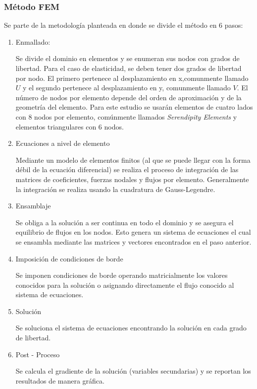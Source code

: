 		\subsubsection{Método FEM}
		Se parte de la metodología planteada en \textcite{Reddy} donde se divide el método en 6 pasos:
			\begin{enumerate}
				\item Enmallado:

				Se divide el dominio en elementos y se enumeran sus nodos con grados de libertad. Para el caso de elasticidad, se deben tener dos grados de libertad por nodo. El primero pertenece al desplazamiento en x,comunmente llamado $U$ y el segundo pertenece al desplazamiento en y, comunmente llamado $V$. El número de nodos por elemento depende del orden de aproximación y de la geometría del elemento. Para este estudio se usarán elementos de cuatro lados con 8 nodos por elemento, comúnmente llamados \textit{Serendipity Elements} y elementos triangulares con 6 nodos.
				\item Ecuaciones a nivel de elemento

				Mediante un modelo de elementos finitos (al que se puede llegar con la forma débil de la ecuación diferencial) se realiza el proceso de integración de las matrices de coeficientes, fuerzas nodales y flujos por elemento. Generalmente la integración se realiza usando la cuadratura de Gauss-Legendre.
				\item Ensamblaje

				Se obliga a la solución a ser continua en todo el dominio y se asegura el equilibrio de flujos en los nodos. Esto genera un sistema de ecuaciones el cual se ensambla mediante las matrices y vectores encontrados en el paso anterior. 
				\item Imposición de condiciones de borde

				Se imponen condiciones de borde operando matricialmente los valores conocidos para la solución o asignando directamente el flujo conocido al sistema de ecuaciones. 
				\item Solución

				Se soluciona el sistema de ecuaciones encontrando la solución en cada grado de libertad.
				\item Post - Proceso

				Se calcula el gradiente de la solución (variables secundarias) y se reportan los resultados de manera gráfica.

			\end{enumerate}
